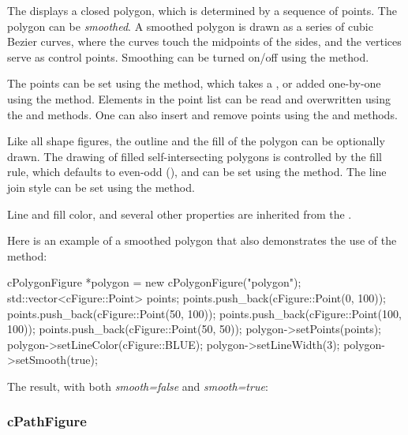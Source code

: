 The  displays a closed polygon, which is determined by a sequence of points.
The polygon can be \textit{smoothed}. A smoothed polygon is drawn as a series
of cubic Bezier curves, where the curves touch the midpoints of the sides,
and the vertices serve as control points. Smoothing can be turned on/off
using the  method.

The points can be set using the  method, which takes a ,
or added one-by-one using the  method. Elements in the point list can be
read and overwritten using the  and  methods. One can also
insert and remove points using the  and  methods.

Like all shape figures, the outline and the fill of the polygon can be optionally drawn.
The drawing of filled self-intersecting polygons is controlled
by the fill rule, which defaults to even-odd (), and
can be set using the  method. The line join style can be set using
the  method.

Line and fill color, and several other properties are inherited from
the .

Here is an example of a smoothed polygon that also demonstrates
the use of the  method:

\begin{cpp}
cPolygonFigure *polygon = new cPolygonFigure("polygon");
std::vector<cFigure::Point> points;
points.push_back(cFigure::Point(0, 100));
points.push_back(cFigure::Point(50, 100));
points.push_back(cFigure::Point(100, 100));
points.push_back(cFigure::Point(50, 50));
polygon->setPoints(points);
polygon->setLineColor(cFigure::BLUE);
polygon->setLineWidth(3);
polygon->setSmooth(true);
\end{cpp}


The result, with both \textit{smooth=false} and \textit{smooth=true}:

\begin{center}

\end{center}


\subsubsection{cPathFigure}
\label{sec:graphics:pathfigure}


